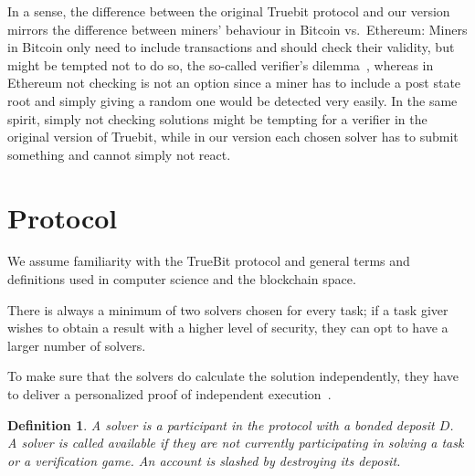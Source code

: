 \documentclass[a4paper]{article}
\newtheorem{definition}[dummy]{Definition}
\begin{document}
In a sense, the difference between the original Truebit protocol and our
version mirrors the difference between miners' behaviour in Bitcoin
vs.\ Ethereum: Miners in Bitcoin only need to include transactions and
should check their validity, but might be tempted not to do so, the
so-called verifier's dilemma~\cite{Luu_demystifyingincentives}, whereas
in Ethereum not checking is not an option since a miner has to include
a post state root and simply giving a random one would be detected very
easily. In the same spirit, simply not checking solutions might be tempting
for a verifier in the original version of Truebit, while in our version
each chosen solver has to submit something and cannot simply not react. 


\section{Protocol}
We assume familiarity with the TrueBit protocol and general terms
and definitions used in computer science and the blockchain space.

There is always a minimum of two solvers chosen for every task; if a task giver wishes
to obtain a result with a higher level of security, they can opt to have a larger number
of solvers.

To make sure that the solvers do calculate the solution independently,
they have to deliver a personalized proof of independent execution~\cite{indiex}.

\begin{definition}
A \emph{solver} is a participant in the protocol with a bonded deposit $D$.\\
A solver is called \emph{available} if they are not currently participating
in solving a task or a verification game. An account is \emph{slashed}
by destroying its deposit.
\end{definition}
\end{document}
